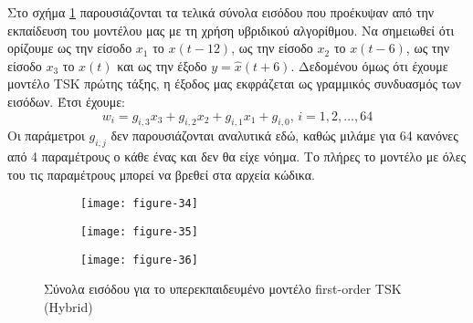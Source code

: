\documentclass[11pt,a4paper,titlepage, oneside]{article}
\newlength\figureheight
\newlength\figurewidth
\begin{document}
			Στο σχήμα \ref{fig:overfit_input_sets} παρουσιάζονται τα τελικά σύνολα εισόδου που προέκυψαν από την εκπαίδευση του μοντέλου μας με τη χρήση υβριδικού αλγορίθμου. Να σημειωθεί ότι ορίζουμε ως την είσοδο $x_1$ το $x(t-12)$, ως την είσοδο $x_2$ το $x(t-6)$, ως την είσοδο $x_3$ το $x(t)$ και ως την έξοδο $y = \hat{x}(t+6)$. Δεδομένου όμως ότι έχουμε μοντέλο TSK πρώτης τάξης, η έξοδος μας εκφράζεται ως γραμμικός συνδυασμός των εισόδων. Έτσι έχουμε:
			$$ w_i = g_{i,3}x_3 + g_{i,2}x_2 + g_{i, 1}x_1 + g_{i,0},\, i = 1,2,\ldots,64 $$
			Οι παράμετροι $g_{i,j}$ δεν παρουσιάζονται αναλυτικά εδώ, καθώς μιλάμε για 64 κανόνες από 4 παραμέτρους ο κάθε ένας και δεν θα είχε νόημα. Το πλήρες το μοντέλο με όλες του τις παραμέτρους μπορεί να βρεθεί στα αρχεία κώδικα.
			\begin{figure}[h]
			 	\setlength{}
				\setlength{}	
				\centering
				\begin{subfigure}[b]{0.32\textwidth}
					\texttt{[image: figure-34]}
				\end{subfigure}
				\begin{subfigure}[b]{0.32\textwidth}
					\texttt{[image: figure-35]}
				\end{subfigure}
				\begin{subfigure}[b]{0.32\textwidth}
					\texttt{[image: figure-36]}
				\end{subfigure}
				\caption{Σύνολα εισόδου για το υπερεκπαιδευμένο μοντέλο first-order TSK (Hybrid)}
				\label{fig:overfit_input_sets}
			\end{figure}
\end{document}
